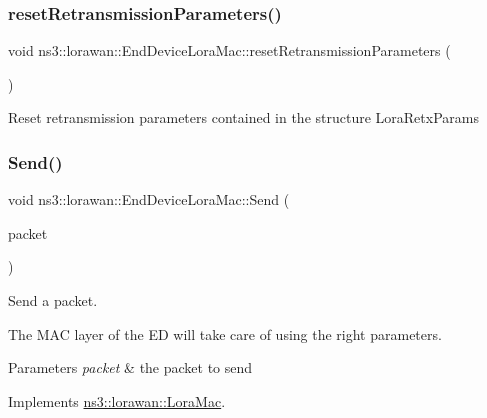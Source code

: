 \subsubsection{\texorpdfstring{reset\+Retransmission\+Parameters()}{resetRetransmissionParameters()}}
{\footnotesize\ttfamily void ns3\+::lorawan\+::\+End\+Device\+Lora\+Mac\+::reset\+Retransmission\+Parameters (\begin{DoxyParamCaption}{ }\end{DoxyParamCaption})\hspace{0.3cm}{\ttfamily [virtual]}}

Reset retransmission parameters contained in the structure Lora\+Retx\+Params \mbox{\label{classns3_1_1lorawan_1_1EndDeviceLoraMac_a6566cdcccf21b69267215758f36e7ee9}} 
\subsubsection{\texorpdfstring{Send()}{Send()}}
{\footnotesize\ttfamily void ns3\+::lorawan\+::\+End\+Device\+Lora\+Mac\+::\+Send (\begin{DoxyParamCaption}\item[{Ptr$<$ Packet $>$}]{packet }\end{DoxyParamCaption})\hspace{0.3cm}{\ttfamily [virtual]}}

Send a packet.

The M\+AC layer of the ED will take care of using the right parameters.


\begin{DoxyParams}{Parameters}
{\em packet} & the packet to send \\
\hline
\end{DoxyParams}


Implements \hyperlink{classns3_1_1lorawan_1_1LoraMac_ac2f3fd92536658192bfa3d1523fff716}{ns3\+::lorawan\+::\+Lora\+Mac}.

\mbox{\label{classns3_1_1lorawan_1_1EndDeviceLoraMac_a4a763f71c529f8557264ea61b7d2b81e}} 
